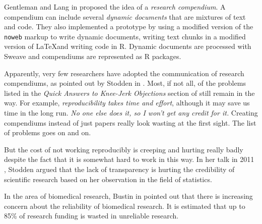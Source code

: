 Gentleman and Lang in \cite{gentleman2007statistical} proposed the idea of a \emph{research compendium}. A compendium can include several \emph{dynamic documents} that are mixtures of text and code. They also implemented a prototype by using a modified version of the \texttt{noweb} markup \cite{ramsey1994literate} to write dynamic documents, writing text chunks in a modified version of \LaTeX and writing code in R. Dynamic documents are processed with Sweave \cite{leisch2002sweave} and compendiums are represented as R packages.

Apparently, very few researchers have adopted the communication of research compendiums, as pointed out by Stodden in \cite{stodden2014enabling}. Most, if not all, of the problems listed in the \emph{Quick Answers to Knee-Jerk Objections} section of \cite{donoho2009reproducible} still remain in the way. For example, \emph{reproducibility takes time and effort}, although it may save us time in the long run. \emph{No one else does it, so I won't get any credit for it.} Creating compendiums instead of just papers really look wasting at the first sight. The list of problems goes on and on.

But the cost of not working reproducibly is creeping and hurting really badly despite the fact that it is somewhat hard to work in this way. In her talk in 2011 \cite{stodden2011establishing}, Stodden argued that the lack of transparency is hurting the credibility of scientific research based on her observation in the field of statistics.

In the area of biomedical research, Bustin in \cite{bustin2015reproducibility} pointed out that there is increasing concern about the reliability of biomedical research. It is estimated that up to 85\% of research funding is wasted in unreliable research.



